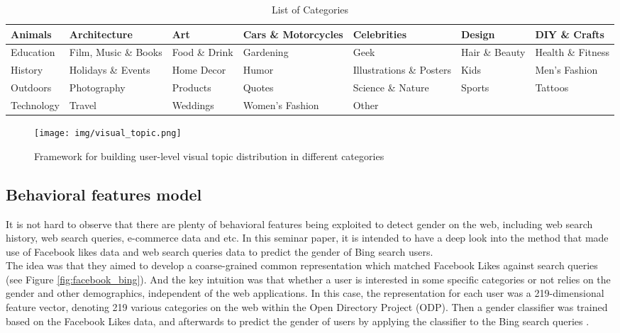 \documentclass[runningheads]{llncs}
\begin{document}
	\begin{table}
		\caption{List of Categories}
		\hskip-2.5cm \begin{tabular}{| l | l | l | l | l | l | l | }
			\hline
			Animals & Architecture
			& Art & Cars \& Motorcycles & Celebrities
			& Design
			& DIY \& Crafts \\
			\hline
			Education & Film, Music \& Books & 
			Food \& Drink  & Gardening & Geek
			& Hair \& Beauty
			& Health \& Fitness \\
			\hline
			History & Holidays \& Events
			& Home Decor &  Humor & Illustrations \& Posters
			& Kids
			& Men’s Fashion \\
			\hline
			Outdoors & Photography
			& Products
			& Quotes & Science \& Nature
			& Sports
			& Tattoos \\
			\hline
			Technology & Travel
			& Weddings
			& Women’s Fashion & Other & &  \\
			\hline
		\end{tabular}
		\label{table:list-categories}
	\end{table}
	
	\begin{figure}
		\centering
		\texttt{[image: img/visual\_topic.png]}
		\caption{Framework for building user-level visual topic distribution in different categories}
		\label{fig:visual_topic}
	\end{figure}
	
	\subsection{Behavioral features model}
	
	It is not hard to observe that there are plenty of behavioral features being exploited to detect gender on the web, including web search history, web search queries, e-commerce data and etc. In this seminar paper, it is intended to have a deep look into the method that made use of Facebook likes data and web search queries data to predict the gender of Bing search users. \\
	
	The idea was that they aimed to develop a coarse-grained common representation which matched Facebook Likes against search queries (see Figure \ref{fig:facebook_bing}). And the key intuition was that whether a user is interested in some specific categories or not relies on the gender and other demographics, independent of the web applications. In this case, the representation for each user was a 219-dimensional feature vector, denoting 219 various categories on the web within the Open Directory Project (ODP). Then a gender classifier was trained based on the Facebook Likes data, and afterwards to predict the gender of users by applying the classifier to the Bing search queries \cite{bi2013inferring}. \\
	
\end{document}
